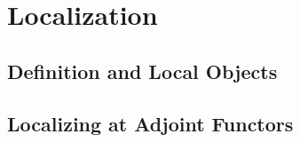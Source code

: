 \documentclass[../../../thesis.tex]{subfiles}
\begin{document}
    
    \section{Localization}

        \subsection{Definition and Local Objects}

        \subsection{Localizing at Adjoint Functors}
        
\end{document}
